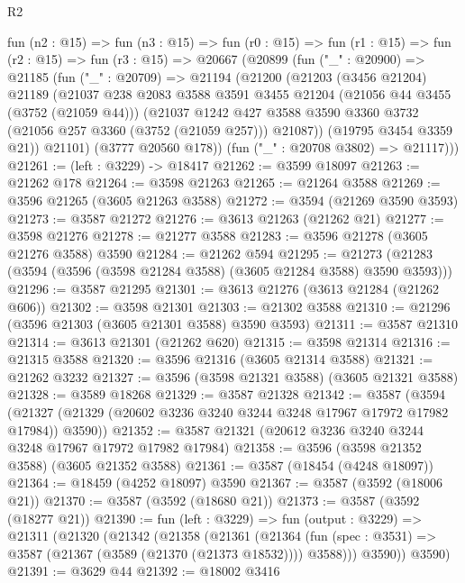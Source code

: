 \begin{lexlean}{R2}
\begin{coremodule}
  fun (n2 : @15) =>
  fun (n3 : @15) =>
  fun (r0 : @15) =>
  fun (r1 : @15) =>
  fun (r2 : @15) =>
  fun (r3 : @15) =>
  @20667
    (@20899
      (fun ("_" : @20900) =>
      @21185
        (fun ("_" : @20709) =>
        @21194
          (@21200
            (@21203
              (@3456 @21204)
              @21189
              (@21037
                @238
                @2083
                @3588
                @3591
                @3455
                @21204
                (@21056 @44 @3455 (@3752 (@21059 @44)))
                (@21037
                  @1242
                  @427
                  @3588
                  @3590
                  @3360
                  @3732
                  (@21056 @257 @3360 (@3752 (@21059 @257)))
                  @21087))
              (@19795 @3454 @3359 @21))
            @21101)
          (@3777 @20560 @178))
        (fun ("_" : @20708 @3802) => @21117)))
@21261 := (left : @3229) -> @18417
@21262 := @3599 @18097
@21263 := @21262 @178
@21264 := @3598 @21263
@21265 := @21264 @3588
@21269 := @3596 @21265 (@3605 @21263 @3588)
@21272 := @3594 (@21269 @3590 @3593)
@21273 := @3587 @21272
@21276 := @3613 @21263 (@21262 @21)
@21277 := @3598 @21276
@21278 := @21277 @3588
@21283 := @3596 @21278 (@3605 @21276 @3588) @3590
@21284 := @21262 @594
@21295 := @21273 (@21283 (@3594 (@3596 (@3598 @21284 @3588) (@3605 @21284 @3588) @3590 @3593)))
@21296 := @3587 @21295
@21301 := @3613 @21276 (@3613 @21284 (@21262 @606))
@21302 := @3598 @21301
@21303 := @21302 @3588
@21310 := @21296 (@3596 @21303 (@3605 @21301 @3588) @3590 @3593)
@21311 := @3587 @21310
@21314 := @3613 @21301 (@21262 @620)
@21315 := @3598 @21314
@21316 := @21315 @3588
@21320 := @3596 @21316 (@3605 @21314 @3588)
@21321 := @21262 @3232
@21327 := @3596 (@3598 @21321 @3588) (@3605 @21321 @3588)
@21328 := @3589 @18268
@21329 := @3587 @21328
@21342 := @3587
    (@3594 (@21327 (@21329 (@20602 @3236 @3240 @3244 @3248 @17967 @17972 @17982 @17984)) @3590))
@21352 := @3587 @21321 (@20612 @3236 @3240 @3244 @3248 @17967 @17972 @17982 @17984)
@21358 := @3596 (@3598 @21352 @3588) (@3605 @21352 @3588)
@21361 := @3587 (@18454 (@4248 @18097))
@21364 := @18459 (@4252 @18097) @3590
@21367 := @3587 (@3592 (@18006 @21))
@21370 := @3587 (@3592 (@18680 @21))
@21373 := @3587 (@3592 (@18277 @21))
@21390 := fun (left : @3229) =>
  fun (output : @3229) =>
  @21311
    (@21320
      (@21342
        (@21358
          (@21361
            (@21364 (fun (spec : @3531) => @3587 (@21367 (@3589 (@21370 (@21373 @18532)))) @3588)))
          @3590))
      @3590)
@21391 := @3629 @44
@21392 := @18002 @3416

\end{coremodule}
\end{lexlean}

